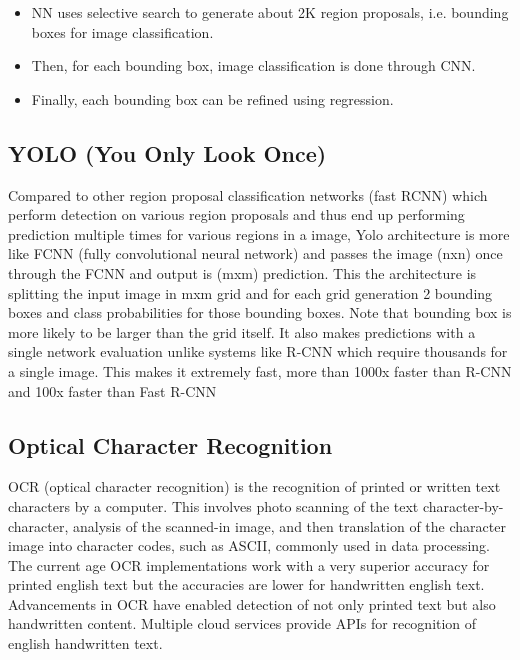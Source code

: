 	\begin{itemize}
		\item NN uses selective search to generate about 2K region proposals, i.e. bounding boxes for image classification.
		\item Then, for each bounding box, image classification is done through CNN.
		\item Finally, each bounding box can be refined using regression.
	\end{itemize}

	\subsection{YOLO (You Only Look Once)}

	Compared to other region proposal classification networks (fast RCNN) which perform detection on various region proposals and thus end up performing prediction multiple times for various regions in a image, Yolo architecture is more like FCNN (fully convolutional neural network) and passes the image (nxn) once through the FCNN and output is (mxm) prediction. This the architecture is splitting the input image in mxm grid and for each grid generation 2 bounding boxes and class probabilities for those bounding boxes. Note that bounding box is more likely to be larger than the grid itself.
	It also makes predictions with a single network evaluation unlike systems like R-CNN which require thousands for a single image. This makes it extremely fast, more than 1000x faster than R-CNN and 100x faster than Fast R-CNN

	\subsection{Optical Character Recognition}

	OCR (optical character recognition) is the recognition of printed or written text characters by a computer. This involves photo scanning of the text character-by-character, analysis of the scanned-in image, and then translation of the character image into character codes, such as ASCII, commonly used in data processing. The current age OCR implementations work with a very superior accuracy for printed english text but the accuracies are lower for handwritten english text. Advancements in OCR have enabled detection of not only printed text but also handwritten content. Multiple cloud services provide APIs for recognition of english handwritten text.


